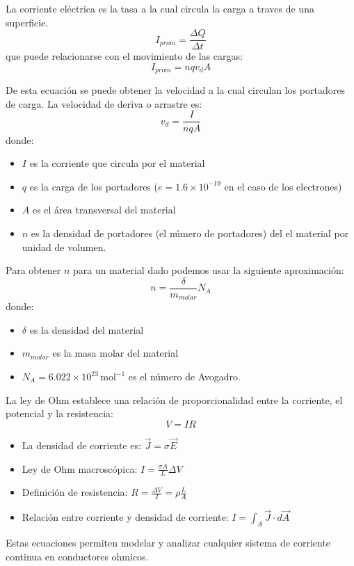 \begin{tcolorbox}[title=Corriente Eléctrica]
  La corriente eléctrica es la tasa a la cual circula la carga a traves de una superficie.
  \[
    I_{prom} = \frac{\Delta Q}{\Delta t}
  \]
  que puede relacionarse con el movimiento de las cargas:
  \[
    I_{prom} = n q v_d A
  \]

  De esta ecuación se puede obtener la velocidad a la cual circulan los portadores de carga. La velocidad de deriva o arrastre es:
  \[
    v_d = \frac{I}{nqA}
  \]
  donde:
  \begin{itemize}
    \item \(I\) es la corriente que circula por el material
    \item \(q\) es la carga de los portadores (\(e=1.6\times10^{-19}\) en el caso de los electrones)
    \item \(A\) es el área transversal del material
    \item \(n\) es la densidad de portadores (el número de portadores) del el material por unidad de volumen.
  \end{itemize}

  Para obtener \(n\) para un material dado podemos usar la siguiente aproximación:
  \[
    n=\frac{\delta}{m_{molar}} N_A
  \]
  donde:
  \begin{itemize}
    \item \(\delta\) es la densidad del material
    \item \(m_{molar}\) es la masa molar del material
    \item \(N_A = 6.022 \times 10^{23} \, \mathrm{mol}^{-1}\) es el número de Avogadro.
  \end{itemize}
\end{tcolorbox}

\begin{tcolorbox}[title=Ley de Ohm]
  La ley de Ohm establece una relación de proporcionalidad entre la corriente, el potencial y la resistencia:
  \[
    V = IR
  \]
  \begin{itemize}
    \item La densidad de corriente es: \(\vec{J} = \sigma \vec{E}\)
    \item Ley de Ohm macroscópica: \(I = \frac{\sigma A}{L} \Delta V\)
    \item Definición de resistencia: \(R = \frac{\Delta V}{I} = \rho \frac{L}{A}\)
    \item Relación entre corriente y densidad de corriente: \(I = \int_A \vec{J} \cdot d\vec{A}\)
  \end{itemize}
  Estas ecuaciones permiten modelar y analizar cualquier sistema de corriente continua en conductores ohmicos.
\end{tcolorbox}


